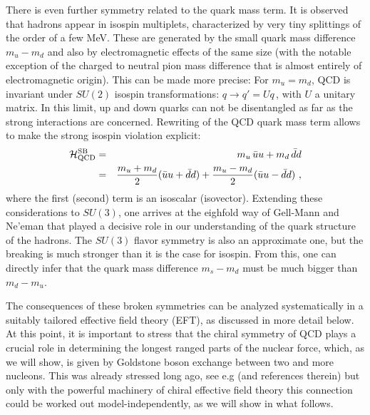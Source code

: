 \documentclass[aps,rmp,nofootinbib,twocolumn,floatfix]{revtex4}
\newcommand{\beqa}{\begin{eqnarray}}
\newcommand{\eeqa}{\end{eqnarray}}
\begin{document}
There is even further symmetry related to the quark mass term. It is observed
that hadrons appear in isospin multiplets, characterized by very tiny
splittings of the order of a few MeV. These are generated by the small
quark mass difference $m_u -m_d$ 
and also by electromagnetic effects of the
same size (with the notable exception of the charged to neutral pion mass
difference that is almost entirely of electromagnetic origin). This can be
made more precise: For $m_u = m_d$, QCD is  invariant under $SU(2)$ isospin 
transformations: $q \to q' = U q\,$,
with $U$ a unitary matrix.
In this limit, up and down quarks can not be disentangled as far as the
strong interactions are concerned.  Rewriting of the QCD quark mass term
allows to make the strong isospin violation explicit:
\beqa
{\cal H}_{\rm QCD}^{\rm SB} &=& m_u \,\bar u u + m_d
  \,\bar  d d \\
             &=& \dfrac{m_u+m_d}{2}(\bar u u + \bar d d)
              + \dfrac{m_u-m_d}{2}(\bar u u - \bar d d)~,
\nonumber
\eeqa
where the first (second) term is an isoscalar (isovector). Extending 
these considerations to $SU(3)$, one arrives at the eighfold way of
Gell-Mann and Ne'eman
that played a decisive role in our understanding
of the quark structure of the hadrons. The $SU(3)$ flavor symmetry
is also an approximate one, but the breaking is much stronger than it is
the case for isospin. From this, one can directly infer that the quark mass
difference $m_s - m_d$ must be much bigger than $m_d -m_u$. 


The consequences of these broken symmetries can be analyzed systematically
in a suitably tailored effective field theory (EFT), as discussed in more
detail below. At this point, it is important to stress that the chiral symmetry
of QCD plays a crucial role in determining the longest ranged parts of the nuclear
force, which, as we will show, is given by Goldstone boson exchange between
two and more nucleons. This was already stressed long ago, see e.g
\cite{Brown:1970th} (and references therein) but only with the powerful
machinery of chiral effective field theory this connection could be
worked out model-independently, as we will show in what follows.
\end{document}
